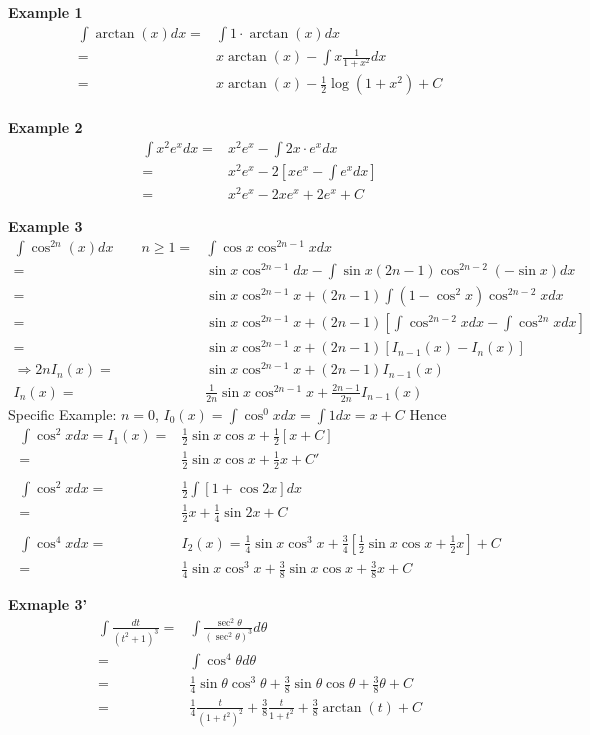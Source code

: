 \documentclass[12pt]{article}
\theoremstyle{plain}
\begin{document}
	{\color{Brown}
	\textbf{Example 1} 
	\begin{align*}
		\int \arctan(x)dx 
		=& \int 1\cdot \arctan(x)dx\\
		=& x\arctan(x) - \int x \frac1{1+x^2}dx\\
		=& x\arctan(x) - \frac12 \log(1+x^2) + C\\
	\end{align*}

	\textbf{Example 2} 
	\begin{align*}
		\int x^2e^xdx 
		=& x^2e^x - \int 2x\cdot e^x dx \\
		=& x^2e^x - 2[xe^x-\int e^xdx] \\
		=& x^2e^x -2xe^x + 2e^x + C
	\end{align*}

	\textbf{Example 3} 
	\begin{align*}
		\int \cos^{2n}(x)dx \qquad n\geq 1 \tag{$I_n$} 
		=& \int \cos x \cos^{2n-1} x dx\\
		=& \sin x \cos^{2n-1} dx - \int \sin x (2n-1) \cos^{2n-2}(-\sin x)dx\\
		=& \sin x \cos ^{2n-1} x + (2n-1)\int (1-\cos^2 x)\cos^{2n-2}xdx\\
		=& \sin x \cos^{2n-1} x + (2n-1)[\int\cos^{2n-2}xdx-\int \cos^{2n}xdx]\\
		=& \sin x \cos^{2n-1} x + (2n-1) [I_{n-1}(x) - I_n(x)]\\
		\Rightarrow 
		2n I_n(x) =& \sin x \cos^{2n-1}x + (2n-1)I_{n-1}(x)\\
		I_n(x) =& \frac1{2n} \sin x \cos^{2n-1}x +\frac{2n-1}{2n}I_{n-1}(x)
		\tag{"Reduction Fomula"}
	\end{align*}
	Specific Example: $n=0$, $I_0(x) = \int\cos^0 x dx = \int 1dx = x+C$
	Hence 
	\begin{align*}
		\int \cos^2 x dx = I_1 (x) 
		=& \frac12\sin x\cos x + \frac12[x+C]\\
		=&\frac12\sin x\cos x + \frac 12 x + C'\\\\
		\int \cos^2 x dx = &\frac12 \int [1+\cos 2x]dx\\
		= &\frac 12 x + \frac 14 \sin 2x + C\\\\
		\int \cos^4 x dx 
		=& I_2(x) 
		=\frac 14 \sin x\cos^3 x +
		\frac 34 [\frac 12 \sin x \cos x + \frac 12 x] + C\\
		=& \frac 14 \sin x \cos^3 x + \frac 38\sin x \cos x + \frac 38 x + C
	\end{align*}

	\textbf{Exmaple 3'} 
	\begin{align*}
		\int \frac{dt}{(t^2+1)^3}
		=& \int \frac{\sec^2 \theta}{(\sec^2\theta)^3}d\theta\\
		=& \int \cos^4\theta d\theta\\
		=& \frac 14 \sin \theta\cos^3\theta + \frac 38 \sin \theta \cos \theta
		+\frac 38 \theta + C\\
		=& \frac 14 \frac t{(1+t^2)^2} + \frac 38 \frac t{1+t^2}
		+\frac 38 \arctan (t) + C
	\end{align*}

	}
\end{document}

